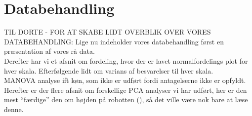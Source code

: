\chapter{Databehandling}
\label{TestAfSkalaDatabehandling}
%
TIL DORTE - FOR AT SKABE LIDT OVERBLIK OVER VORES DATABEHANDLING: \blankline
%
Lige nu indeholder vores databehandling først en præsentation af vores rå data. \\
Derefter har vi et afsnit om fordeling, hvor der er lavet normalfordelings plot for hver skala. Efterfølgende lidt om varians af besvarelser til hver skala. \\
MANOVA analyse ift køn, som ikke er udført fordi antagelserne ikke er opfyldt.\\
Herefter er der flere afsnit om forskellige PCA analyser vi har udført, her er den mest ``færdige'' den om højden på robotten (), så det ville være nok bare at læse denne. 